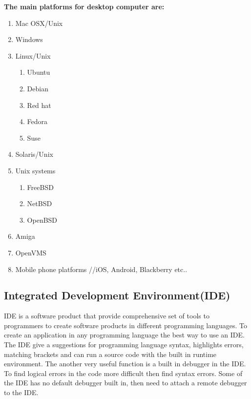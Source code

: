 \documentclass[12pt]{article}
\begin{document}
{{\setlength{\parindent}{0cm} 
\textbf{The main platforms for desktop computer are:}
}
\begin{enumerate}
\item Mac OSX/Unix
\item Windows
\item Linux/Unix
	\begin{enumerate}
	\item Ubuntu
	\item Debian
	\item Red hat
	\item Fedora
	\item Suse
	\end{enumerate}
\item Solaris/Unix
\item Unix systems
	\begin{enumerate}
	\item FreeBSD
	\item NetBSD
	\item OpenBSD
	\end{enumerate}
\item Amiga
\item OpenVMS
\item Mobile phone platforms //iOS, Android, Blackberry etc..
\end{enumerate}

\subsection{Integrated Development Environment(IDE)}
IDE is a software product that provide comprehensive set of tools to programmers to create software products in different programming languages. 
To create an application in any programming language the best way to use an IDE. The IDE give a suggestions for programming language syntax, highlights errors, matching brackets and can run a source code with the built in runtime environment. The another very useful function is a built in debugger in the IDE. To find logical errors in the code more difficult then find syntax errors. Some of the IDE has no default debugger built in, then need to attach a remote debugger to the IDE.\\

}
\end{document}
